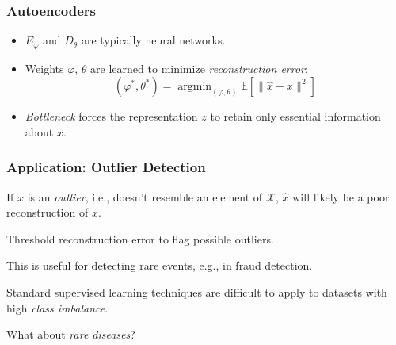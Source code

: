 \documentclass[xcolor={dvipsnames}]{beamer}
\renewcommand{\phi}{\varphi}
\newcommand{\df}[1]{\textcolor{BrickRed}{\emph{#1}}}
\newcommand{\cX}{\mathcal{X}}
\newcommand{\EE}{\mathbb{E}}
\DeclareMathOperator*{\argmin}{argmin}
\begin{document}
\begin{frame}
    \frametitle{Autoencoders}

    \begin{center}
        \end{center}


    \begin{itemize}
        \setlength\itemsep{1em}

        \item $E_\phi$ and $D_\theta$ are typically neural networks.
        
        \item Weights $\phi$, $\theta$ are learned to minimize \df{reconstruction error}:
        \[
            (\phi^*,\theta^*) = \argmin_{(\phi, \theta)}\EE\left[\|\widehat x - x\|^2\right]
        \]

        \item \df{Bottleneck} forces the representation $z$ to retain only essential information about $x$.
    \end{itemize}
\end{frame}

\begin{frame}
    \frametitle{Application: Outlier Detection}
    \setlength\parskip{1em}
    If $x$ is an \df{outlier}, i.e., doesn't resemble an element of $\cX$, $\widehat x$ will likely be a poor reconstruction of $x$.

    Threshold reconstruction error to flag possible outliers.
    
    This is useful for detecting rare events, e.g., in fraud detection.

    Standard supervised learning techniques are difficult to apply to datasets with high
    \df{class imbalance}.

    What about \df{rare diseases}?
\end{frame}
\end{document}
